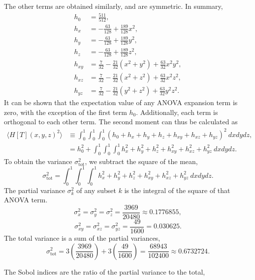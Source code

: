 The other terms are obtained similarly, and are symmetric.  In summary,
\begin{align}
  h_0 &= \frac{511}{512}, \\
  h_x &= -\frac{63}{128} + \frac{189}{128}x^2, \\
  h_y &= -\frac{63}{128} + \frac{189}{128}y^2, \\
  h_z &= -\frac{63}{128} + \frac{189}{128}z^2, \\
  h_{xy} &= \frac{7}{32} - \frac{21}{32}(x^2+y^2) + \frac{63}{32}x^2y^2, \\
  h_{xz} &= \frac{7}{32} - \frac{21}{32}(x^2+z^2) + \frac{63}{32}x^2z^2, \\
  h_{yz} &= \frac{7}{32} - \frac{21}{32}(y^2+z^2) + \frac{63}{32}y^2z^2.
\end{align}
It can be shown that the expectation value of any ANOVA expansion term is zero, with the exception of the
first term $h_0$.  Additionally, each term is orthogonal to each other term.  The second moment can thus be
calculated as
\begin{align}
  \langle H[T](x,y,z)^2\rangle &\equiv \int_0^1\int_0^1\int_0^1 (h_0+h_x+h_y+h_z+h_{xy}+h_{xz}+h_{yz})^2\
  dxdydz, \nonumber\\
  &= h_0^2+\int_0^1\int_0^1\int_0^1 h_x^2+h_y^2+h_z^2+h_{xy}^2+h_{xz}^2+h_{yz}^2\ dxdydz.
\end{align}
To obtain the variance $\sigma_\text{tot}^2$, we subtract the square of the mean,
\begin{equation}
  \sigma_\text{tot}^2 = \int_0^1\int_0^1\int_0^1 h_x^2+h_y^2+h_z^2+h_{xy}^2+h_{xz}^2+h_{yz}^2\ dxdydz.
\end{equation}
The partial variance $\sigma_k^2$ of any subset $k$ is the integral of the square of that ANOVA term.
\begin{equation}
  \sigma_x^2 = \sigma_y^2 = \sigma_z^2 = \frac{3969}{20480} \approx0.1776855,
\end{equation}
\begin{equation}
  \sigma_{xy}^2 = \sigma_{xz}^2 = \sigma_{yz}^2 = \frac{49}{1600} =0.030625.
\end{equation}
The total variance is a sum of the partial variances,
\begin{equation}
  \sigma_\text{tot}^2 = 3\left(\frac{3969}{20480}\right) + 3\left(\frac{49}{1600}\right) =
  \frac{68943}{102400} \approx 0.6732724.
\end{equation}

The Sobol indices are the ratio of the partial variance to the total,

